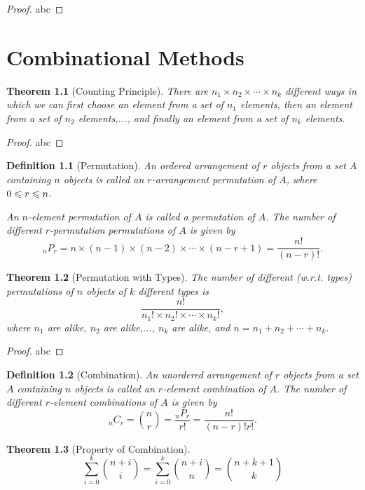 \documentclass[openany,12pt]{book}
\newtheorem{theorem}{Theorem}[chapter]
\newtheorem{definition}{Definition}[chapter]
\begin{document}
\begin{proof}
  abc
\end{proof}

\chapter{Combinational Methods}

\begin{theorem}[Counting Principle]
There are $n_1\times n_2\times\cdots\times n_k$ different ways in which we can first choose an element from a set of $n_1$  elements, then an element from a set of $n_2$ elements,..., and finally an element from a set of $n_k$ elements.
\end{theorem}

\begin{proof}
  abc
\end{proof}

\begin{definition}[Permutation]
An ordered arrangement of $r$ objects from a set $A$ containing $n$ objects is called an $r$-arrangement permutation of $A$, where $0\leqslant r\leqslant n$. 

An $n$-element permutation of $A$ is called a permutation of $A$. The number of different $r$-permutation permutations of $A$ is given by $$_nP_r =n\times(n-1)\times(n-2)\times\cdots\times(n-r+1)=\frac{n!}{(n-r)!}.$$
\end{definition}

\begin{theorem}[Permutation with Types]
The number of different (w.r.t. types) permutations of $n$ objects of $k$ different types is $$\frac{n!}{n_1 !\times n_2 !\times\cdots\times n_k !},$$
where $n_1$  are alike, $n_2$  are alike,..., $n_k$  are alike, and $n=n_1+n_2+\cdots+n_k $.
\end{theorem}

\begin{proof}
  abc
\end{proof}

\begin{definition}[Combination]
An unordered arrangement of $r$ objects from a set $A$ containing $n$ objects is called an $r$-element combination of $A$. The number of different $r$-element combinations of $A$ is given by 
$$_n C_r =\binom n r=\frac{_n P_r}{r!}=\frac{n!}{(n-r)!r!}.$$
\end{definition}

\begin{theorem}[Property of Combination]
$$\sum_{i=0}^k\binom {n+i} i=\sum_{i=0}^k \binom {n+i} n
=\binom {n+k+1} k$$
\end{theorem}
\end{document}
